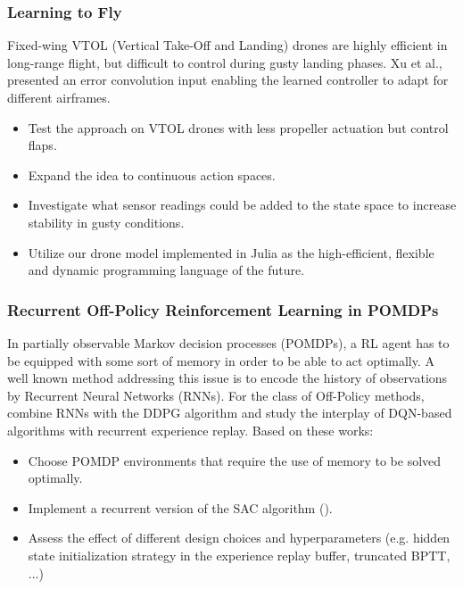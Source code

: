 \documentclass[a4paper]{article}
\begin{document}
\subsubsection{Learning to Fly}
Fixed-wing VTOL (Vertical Take-Off and Landing) drones are highly efficient in long-range flight, but difficult to control during gusty landing phases. Xu et al., \cite{LearningToFly} presented an error convolution input enabling the learned controller to adapt for different airframes.
\begin{itemize}
  \item Test the approach on VTOL drones with less propeller actuation but control flaps.
  \item Expand the idea to continuous action spaces.
  \item Investigate what sensor readings could be added to the state space to increase stability in gusty conditions.
  \item Utilize our drone model \cite{BionicVTOL} implemented in Julia as the high-efficient, flexible and dynamic programming language of the future.
\end{itemize}


\subsubsection{Recurrent Off-Policy Reinforcement Learning in POMDPs}
In partially observable Markov decision processes (POMDPs), a RL agent has to be equipped with some sort of memory in order to be able to act optimally. A well known method addressing this issue is to encode the history of observations by Recurrent Neural Networks (RNNs).
For the class of Off-Policy methods, \cite{heess2015memory} combine RNNs with the DDPG algorithm and \cite{kapturowski2018recurrent} study the interplay of DQN-based algorithms with recurrent experience replay.
Based on these works:
\begin{itemize}
  \item Choose POMDP environments that require the use of memory to be solved optimally.
  \item Implement a recurrent version of the SAC algorithm (\cite{Haarnoja2018a}).
  \item Assess the effect of different design choices and hyperparameters (e.g. hidden state initialization strategy in the experience replay buffer, truncated BPTT, ...)
\end{itemize}
\end{document}
